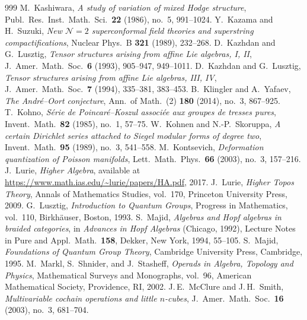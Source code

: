 \begin{thebibliography}{999}
 M.~Kashiwara, \emph{A study of variation of mixed Hodge structure}, Publ.\ Res.\ Inst.\ Math.\ Sci.\ \textbf{22} (1986), no.~5, 991--1024.
 Y.~Kazama and H.~Suzuki, \emph{New $\mathcal N{=}2$ superconformal field theories and superstring compactifications}, Nuclear Phys.\ B \textbf{321} (1989), 232--268. %
 D.~Kazhdan and G.~Lusztig, \emph{Tensor structures arising from affine Lie algebras, I, II}, J.~Amer.\ Math.\ Soc.\ \textbf{6} (1993), 905--947, 949--1011.
 D.~Kazhdan and G.~Lusztig, \emph{Tensor structures arising from affine Lie algebras, III, IV}, J.~Amer.\ Math.\ Soc.\ \textbf{7} (1994), 335--381, 383--453.
 B.~Klingler and A.~Yafaev, \emph{The Andr\'e--Oort conjecture}, Ann.\ of Math.\ (2) \textbf{180} (2014), no.~3, 867--925.
 T.~Kohno, \emph{S\'erie de Poincar\'e--Koszul associ\'ee aux groupes de tresses pures}, Invent.\ Math.\ \textbf{82} (1985), no.~1, 57--75.
 W.~Kohnen and N.-P.~Skoruppa, \emph{A certain Dirichlet series attached to Siegel modular forms of degree two}, Invent.\ Math.\ \textbf{95} (1989), no.~3, 541--558.
 M.~Kontsevich, \emph{Deformation quantization of Poisson manifolds}, Lett.\ Math.\ Phys.\ \textbf{66} (2003), no.~3, 157--216. %
 J.~Lurie, \emph{Higher Algebra}, available at \url{https://www.math.ias.edu/~lurie/papers/HA.pdf}, 2017. %
 J.~Lurie, \emph{Higher Topos Theory}, Annals of Mathematics Studies, vol.~170, Princeton University Press, 2009. %
 G.~Lusztig, \emph{Introduction to Quantum Groups}, Progress in Mathematics, vol.~110, Birkh\"auser, Boston, 1993.
 S.~Majid, \emph{Algebras and Hopf algebras in braided categories}, in \emph{Advances in Hopf Algebras} (Chicago, 1992), Lecture Notes in Pure and Appl.\ Math.\ \textbf{158}, Dekker, New York, 1994, 55--105.
 S.~Majid, \emph{Foundations of Quantum Group Theory}, Cambridge University Press, Cambridge, 1995.
 M.~Markl, S.~Shnider, and J.~Stasheff, \emph{Operads in Algebra, Topology and Physics}, Mathematical Surveys and Monographs, vol.~96, American Mathematical Society, Providence, RI, 2002.
 J.\,E.~McClure and J.\,H.~Smith, \emph{Multivariable cochain operations and little $n$-cubes}, J.~Amer.\ Math.\ Soc.\ \textbf{16} (2003), no.~3, 681--704.

\end{thebibliography}
